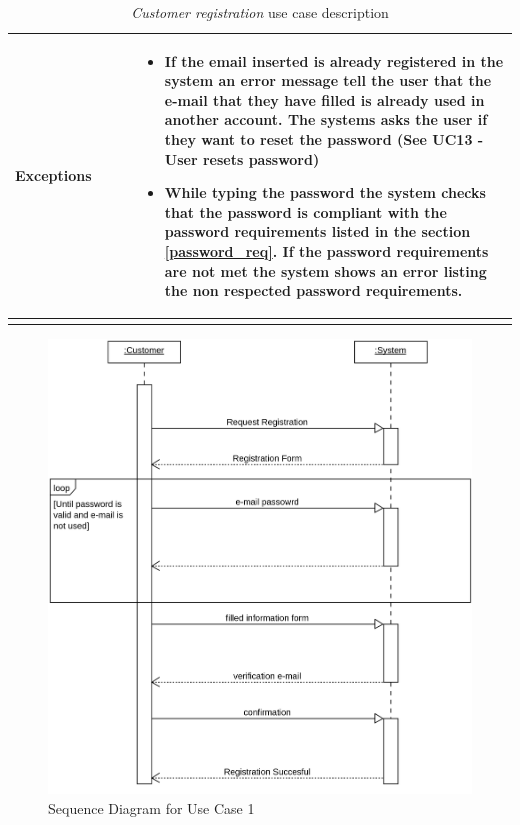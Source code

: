 \begin{longtable}{p{0.25\linewidth}p{0.75\linewidth}}
    \midrule
    \textbf{Exceptions}       &
    \begin{itemize}
        \item If the email inserted is already registered in the system an error message tell the user that the e-mail that they have filled is already used in another account. The systems asks the user if they want to reset the password (See UC13 - User resets password) %
        \item While typing the password the system checks that the password is compliant with the password requirements listed in the section \ref{password_req}. If the password requirements are not met the system shows an error listing the non respected password requirements.
    \end{itemize}                                                                                                                                     \\
    \bottomrule
    \caption{\emph{Customer registration} use case description}
\end{longtable}

\begin{figure}[H]
    \includegraphics[width=\textwidth]{Images/UML_Seq_Diag_1.png}
    \caption{\label{fig:Use_Case_Diag}Sequence Diagram for Use Case 1}
\end{figure}

